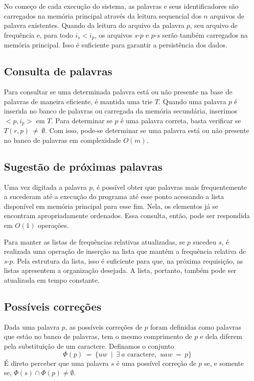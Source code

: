 \documentclass[12pt]{article}
\begin{document}
    No começo de cada execução do sistema, as palavras e seus identificadores são carregados na memória principal através da leitura sequencial dos $n$ arquivos de palavra existentes.
    Quando da leitura do arquivo da palavra $p$, seu arquivo de frequência e, para todo $i_s < i_p$, os arquivos $s$-$p$ e $p$-$s$ serão também carregados na memória principal.
    Isso é suficiente para garantir a persistência dos dados.

    \subsection{Consulta de palavras}
    Para consultar se uma determinada palavra está ou não presente na base de palavras de maneira eficiente, é mantida uma trie $T$.
    Quando uma palavra $p$ é inserida no banco de palavras ou carregada da memória secundária, inserimos $<p, i_p>$ em $T$.
    Para determinar se $p$ é uma palavra correta, basta verificar se $T(r, p)~\ne~\emptyset$.
    Com isso, pode-se determinar se uma palavra está ou não presente no banco de palavras em complexidade $O(m)$.

    \subsection{Sugestão de próximas palavras}
    Uma vez digitada a palavra $p$, é possível obter que palavras mais frequentemente a sucederam até a execução do programa até esse ponto acessando a lista disponível em memória principal para esse fim.
    Nela, os elementos já se encontram apropriadamente ordenados.
    Essa consulta, então, pode ser respondida em $O(1)$ operações.

    Para manter as listas de frequências relativas atualizadas, se $p$ sucedeu $s$, é realizada uma operação de inserção na lista que mantém a frequência relativa de $s$-$p$.
    Pela estrutura da lista, isso é suficiente para que, na próxima requisição, as listas apresentem a organização desejada.
    A lista, portanto, também pode ser atualizada em tempo constante.

    \subsection{Possíveis correções}
    Dada uma palavra $p$, as possíveis correções de $p$ foram definidas como palavras que estão no banco de palavras, tem o mesmo comprimento de $p$ e dela diferem pela substituição de um caractere.
    Definamos o conjunto $$\Phi(p)~=~\{uw~\mid~\exists~a \text{ caractere, }~uaw~=~p\}$$
    É direto perceber que uma palavra $s$ é uma possível correção de $p$ se, e somente se, $\Phi(s) \cap \Phi(p) \ne \emptyset$.
\end{document}
